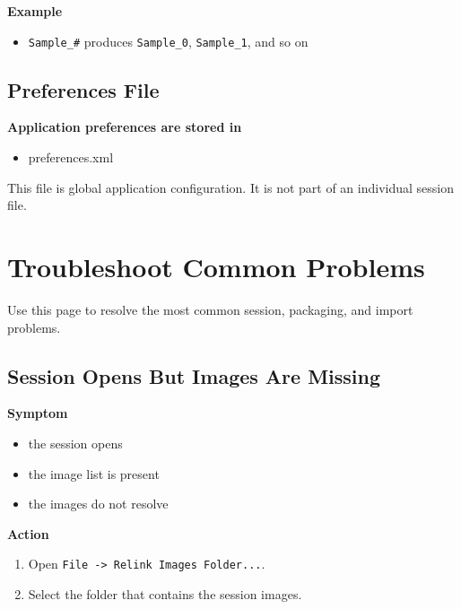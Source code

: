 \documentclass[
  9pt,
  letterpaper,
  oneside,
  open=any,
  DIV=15,
  parskip=half-,
  headings=big,
  numbers=noenddot
]{scrbook}
\newcommand{\manuallead}[1]{%
  \vspace{0.15em}%
  {\sffamily\bfseries\color{ManualBlue}#1}\par\nobreak\vspace{0.05em}%
}
\begin{document}
\manuallead{Example}

\begin{itemize}[leftmargin=*,itemsep=0.35em,topsep=0.4em]
\item \texttt{Sample\_\#} produces \texttt{Sample\_0}, \texttt{Sample\_1}, and so on
\end{itemize}

\section{Preferences File}

\manuallead{Application preferences are stored in}

\begin{itemize}[leftmargin=*,itemsep=0.35em,topsep=0.4em]
\item preferences.xml
\end{itemize}

This file is global application configuration. It is not part of an individual session file.


\chapter{Troubleshoot Common Problems}

Use this page to resolve the most common session, packaging, and import problems.


\section{Session Opens But Images Are Missing}

\manuallead{Symptom}

\begin{itemize}[leftmargin=*,itemsep=0.35em,topsep=0.4em]
\item the session opens
\item the image list is present
\item the images do not resolve
\end{itemize}

\manuallead{Action}

\begin{enumerate}[leftmargin=*,itemsep=0.35em,topsep=0.4em]
\item Open \texttt{File -> Relink Images Folder...}.
\item Select the folder that contains the session images.
\end{enumerate}
\end{document}
